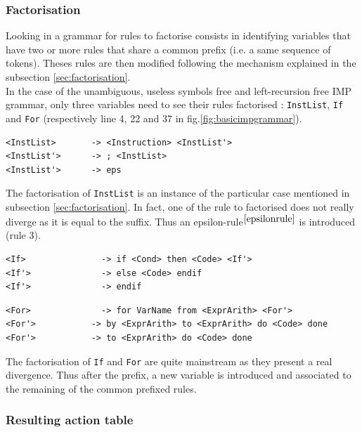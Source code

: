 \documentclass[a4paper,11pt]{article}
\begin{document}
    \subsubsection{Factorisation}
      Looking in a grammar for rules to factorise consists in identifying variables that have two or more rules that share a common prefix (i.e. a same sequence of tokens). Theses rules are then modified following the mechanism explained in the subsection \ref{sec:factorisation}.\\
      In the case of the unambiguous, useless symbols free and left-recursion free IMP grammar, only three variables need to see their rules factorised : \verb|InstList|, \verb|If| and \verb|For| (respectively line 4, 22 and 37 in fig.\ref{fig:basicimpgrammar}).
      \begin{lstlisting}
<InstList>	     -> <Instruction> <InstList'> 
<InstList'>	     -> ; <InstList> 
<InstList'>	     -> eps\end{lstlisting}
      The factorisation of \verb|InstList| is an instance of the particular case mentioned in subsection \ref{sec:factorisation}. In fact, one of the rule to factorised does not really diverge as it is equal to the suffix. Thus an epsilon-rule$^{\ref{epsilonrule}}$ is introduced (rule 3).
      \begin{lstlisting}
<If>	           -> if <Cond> then <Code> <If'> 
<If'>	           -> else <Code> endif 
<If'>	           -> endif\end{lstlisting}
      \begin{lstlisting}
<For>	           -> for VarName from <ExprArith> <For'> 
<For'>	         -> by <ExprArith> to <ExprArith> do <Code> done 
<For'>	         -> to <ExprArith> do <Code> done\end{lstlisting}
      The factorisation of \verb|If| and \verb|For| are quite mainstream as they present a real divergence. Thus after the prefix,  a new variable is introduced and associated to the remaining of the common prefixed rules.
      
    \subsubsection{Resulting action table}
    
\end{document}
